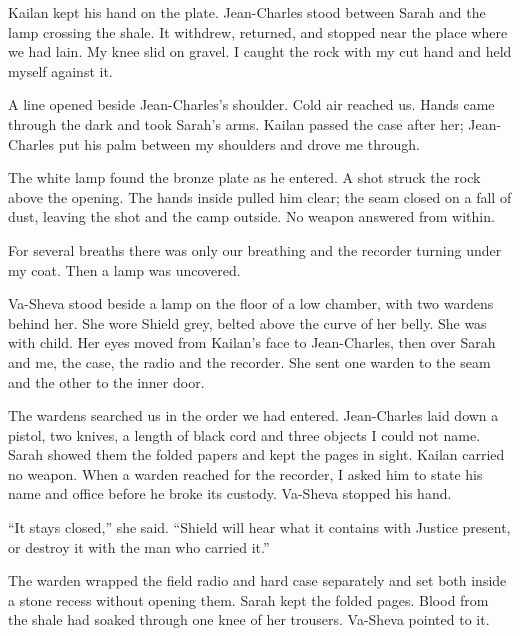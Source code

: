 Kailan kept his hand on the plate. Jean-Charles stood between Sarah and the lamp crossing the shale. It withdrew, returned, and stopped near the place where we had lain. My knee slid on gravel. I caught the rock with my cut hand and held myself against it.\par

A line opened beside Jean-Charles's shoulder. Cold air reached us. Hands came through the dark and took Sarah's arms. Kailan passed the case after her; Jean-Charles put his palm between my shoulders and drove me through.\par

The white lamp found the bronze plate as he entered. A shot struck the rock above the opening. The hands inside pulled him clear; the seam closed on a fall of dust, leaving the shot and the camp outside. No weapon answered from within.\par

For several breaths there was only our breathing and the recorder turning under my coat. Then a lamp was uncovered.\par

\ornament

Va-Sheva stood beside a lamp on the floor of a low chamber, with two wardens behind her. She wore Shield grey, belted above the curve of her belly. She was with child. Her eyes moved from Kailan's face to Jean-Charles, then over Sarah and me, the case, the radio and the recorder. She sent one warden to the seam and the other to the inner door.\par

The wardens searched us in the order we had entered. Jean-Charles laid down a pistol, two knives, a length of black cord and three objects I could not name. Sarah showed them the folded papers and kept the pages in sight. Kailan carried no weapon. When a warden reached for the recorder, I asked him to state his name and office before he broke its custody. Va-Sheva stopped his hand.\par

``It stays closed,'' she said. ``Shield will hear what it contains with Justice present, or destroy it with the man who carried it.''\par

The warden wrapped the field radio and hard case separately and set both inside a stone recess without opening them. Sarah kept the folded pages. Blood from the shale had soaked through one knee of her trousers. Va-Sheva pointed to it.\par


